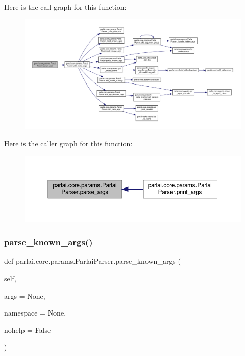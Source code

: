 Here is the call graph for this function\+:
\nopagebreak
\begin{figure}[H]
\begin{center}
\leavevmode
\includegraphics[width=350pt]{classparlai_1_1core_1_1params_1_1ParlaiParser_ad549d75e2808d63fbc5c5d0e30682f18_cgraph}
\end{center}
\end{figure}
Here is the caller graph for this function\+:
\nopagebreak
\begin{figure}[H]
\begin{center}
\leavevmode
\includegraphics[width=350pt]{classparlai_1_1core_1_1params_1_1ParlaiParser_ad549d75e2808d63fbc5c5d0e30682f18_icgraph}
\end{center}
\end{figure}
\mbox{\label{classparlai_1_1core_1_1params_1_1ParlaiParser_a2a98c07f7393108ad67773951038f191}} 
\subsubsection{\texorpdfstring{parse\+\_\+known\+\_\+args()}{parse\_known\_args()}}
{\footnotesize\ttfamily def parlai.\+core.\+params.\+Parlai\+Parser.\+parse\+\_\+known\+\_\+args (\begin{DoxyParamCaption}\item[{}]{self,  }\item[{}]{args = {\ttfamily None},  }\item[{}]{namespace = {\ttfamily None},  }\item[{}]{nohelp = {\ttfamily False} }\end{DoxyParamCaption})}


